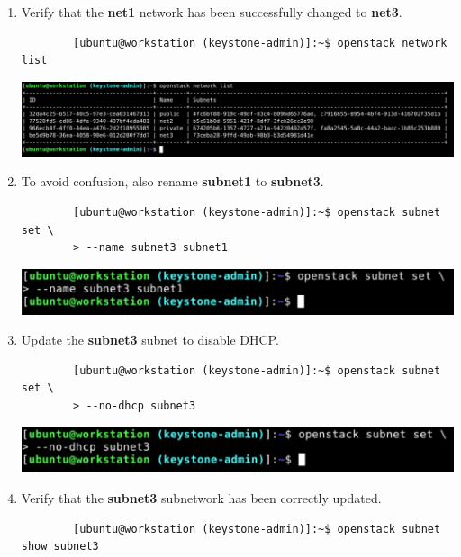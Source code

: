 \documentclass[letterpaper, 12pt]{article}
\begin{document}
\begin{enumerate}
    \item Verify that the \textbf{net1} network has been successfully changed to \textbf{net3}.
    \begin{lstlisting}
        [ubuntu@workstation (keystone-admin)]:~$ openstack network list
    \end{lstlisting}

    \begin{center}
        \includegraphics[width=\linewidth]{images/part3/step18.png}
    \end{center}

    \item To avoid confusion, also rename \textbf{subnet1} to \textbf{subnet3}.
    \begin{lstlisting}
        [ubuntu@workstation (keystone-admin)]:~$ openstack subnet set \
        > --name subnet3 subnet1
    \end{lstlisting}

    \begin{center}
        \includegraphics[width=\linewidth]{images/part3/step19.png}
    \end{center}

    \item Update the \textbf{subnet3} subnet to disable DHCP.
    \begin{lstlisting}
        [ubuntu@workstation (keystone-admin)]:~$ openstack subnet set \
        > --no-dhcp subnet3
    \end{lstlisting}

    \begin{center}
        \includegraphics[width=\linewidth]{images/part3/step21.png}
    \end{center}

    \item Verify that the \textbf{subnet3} subnetwork has been correctly updated.
    \begin{lstlisting}
        [ubuntu@workstation (keystone-admin)]:~$ openstack subnet show subnet3
    \end{lstlisting}


\end{enumerate}
\end{document}
